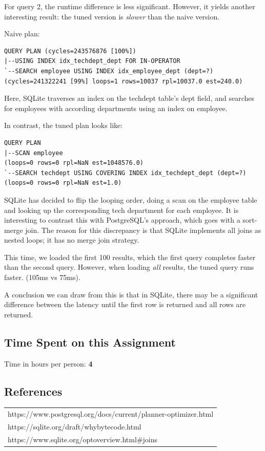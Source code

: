\documentclass[11pt]{scrartcl}
\begin{document}
For query 2, the runtime difference is less significant.  However, it yields another interesting result: the tuned version is \textit{slower} than the naive version.

Naive plan:

{\small
\parskip0pt\begin{verbatim}
QUERY PLAN (cycles=243576876 [100%])
|--USING INDEX idx_techdept_dept FOR IN-OPERATOR
`--SEARCH employee USING INDEX idx_employee_dept (dept=?)     (cycles=241322241 [99%] loops=1 rows=10037 rpl=10037.0 est=240.0)
\end{verbatim}}

Here, SQLite traverses an index on the techdept table's dept field, and searches for employees with according departments using an index on employee.

In contrast, the tuned plan looks like:

{\small
\parskip0pt\begin{verbatim}
QUERY PLAN
|--SCAN employee                                                       (loops=0 rows=0 rpl=NaN est=1048576.0)
`--SEARCH techdept USING COVERING INDEX idx_techdept_dept (dept=?)     (loops=0 rows=0 rpl=NaN est=1.0)
\end{verbatim}}

SQLite has decided to flip the looping order, doing a scan on the employee table and looking up the corresponding tech department for each employee.  It is interesting to contrast this with PostgreSQL's approach, which goes with a sort-merge join.  The reason for this discrepancy is that SQLite implements all joins as nested loops; it has no merge join strategy.

This time, we loaded the first 100 results, which the first query completes faster than the second query.  However, when loading \textit{all} results, the tuned query runs faster. (105ms vs 75ms).

A conclusion we can draw from this is that in SQLite, there may be a significant difference between the latency until the first row is returned and all rows are returned.

\subsection*{Time Spent on this Assignment}

Time in hours per person: \textbf{4}

\subsection*{References}

\begin{table}[H]
  \centering
  \begin{tabular}{l}
    \hline
    https://www.postgresql.org/docs/current/planner-optimizer.html \tabularnewline
    https://sqlite.org/draft/whybytecode.html \tabularnewline
    https://www.sqlite.org/optoverview.html#joins \tabularnewline
    \hline
  \end{tabular}
\end{table}
\end{document}
